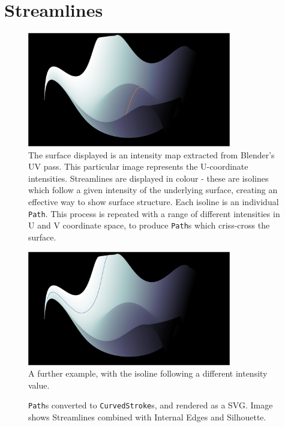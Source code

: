 \section{Streamlines}\label{impl_stream}
\begin{figure}[h!]
	\centering
	\includegraphics[height=5cm]{images/stream_cont1.png}
	\caption{The surface displayed is an intensity map extracted from Blender's UV pass. This particular image represents the U-coordinate intensities. Streamlines are displayed in colour - these are isolines which follow a given intensity of the underlying surface, creating an effective way to show surface structure. Each isoline is an individual \texttt{Path}. This process is repeated with a range of different intensities in U and V coordinate space, to produce \texttt{Path}s which criss-cross the surface.}\label{stream_cont1}
\end{figure}

\begin{figure}[h!]
	\centering
	\includegraphics[height=5cm]{images/stream_cont2.png}
	\caption{A further example, with the isoline following a different intensity value.}\label{stream_cont1}
\end{figure}

\begin{figure}[h!]
	\centering
	
	\caption{\texttt{Path}s converted to \texttt{CurvedStroke}s, and rendered as a SVG. Image shows Streamlines combined with Internal Edges and Silhouette.}\label{stream}
\end{figure}

